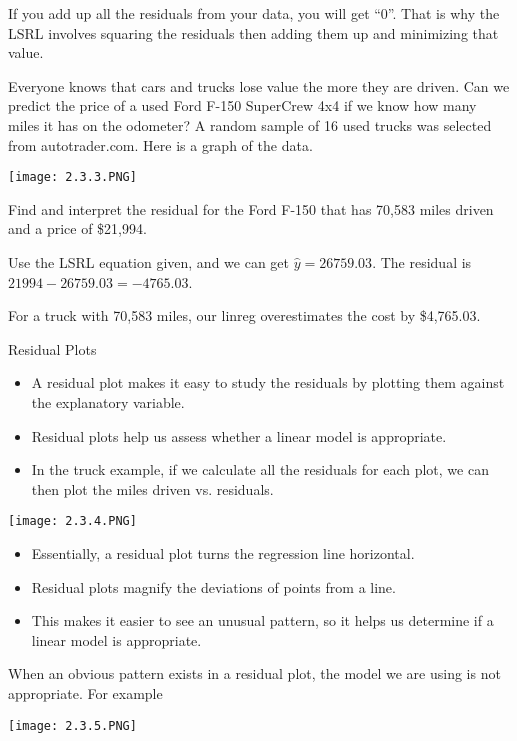 \documentclass[../stats.tex]{subfiles}
\begin{document}
If you add up all the residuals from your data, you will get ``0''. That is why the LSRL involves squaring the residuals then adding them up and minimizing that value.

\begin{example}
    Everyone knows that cars and trucks lose value the more they are driven. Can we predict the price of a used Ford F-150 SuperCrew 4x4 if we know how many miles it has on the odometer? A random sample of 16 used trucks was selected from autotrader.com. Here is a graph of the data.
    \begin{center}
        \texttt{[image: 2.3.3.PNG]}
    \end{center}

    Find and interpret the residual for the Ford F-150 that has 70,583 miles driven and a price of \$21,994.

    Use the LSRL equation given, and we can get $\hat{y}=26759.03$. The residual is $21994-26759.03=-4765.03$.

    For a truck with 70,583 miles, our linreg overestimates the cost by \$4,765.03.
\end{example}

Residual Plots 
\begin{itemize}
    \item A residual plot makes it easy to study the residuals by plotting them against the explanatory variable.
    \item Residual plots help us assess whether a linear model is appropriate.
    \item In the truck example, if we calculate all the residuals for each plot, we can then plot the miles driven vs. residuals.
\end{itemize}
\begin{center}
    \texttt{[image: 2.3.4.PNG]}
\end{center}
\begin{itemize}
    \item Essentially, a residual plot turns the regression line horizontal.
    \item Residual plots magnify the deviations of points from a line.
    \item This makes it easier to see an unusual pattern, so it helps us determine if a linear model is appropriate.
\end{itemize}

When an obvious pattern exists in a residual plot, the model we are using is not appropriate. For example 
\begin{center}
    \texttt{[image: 2.3.5.PNG]}
\end{center}
\end{document}

